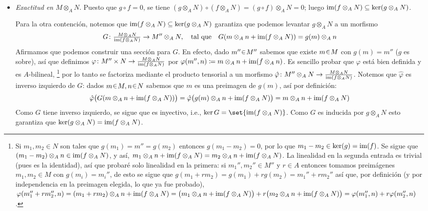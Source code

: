 \begin{sol}
\begin{itemize}
    \item\emph{Exactitud en $M\otimes_A N$}. Puesto que $g\circ f = 0$, se tiene $(g\otimes_A N)\circ(f\otimes_A N) = (g\circ f)\otimes_A N = 0$; luego $\operatorname{im}(f\otimes_A N)\subseteq \ker(g\otimes_A N)$.\par
    Para la otra contención, notemos que $\operatorname{im}(f\otimes_A N)\subseteq \ker(g\otimes_A N)$ garantiza que podemos levantar $g\otimes_A N$ a un morfismo
    \[
    G \colon \tfrac{M \otimes_A N}{\operatorname{im}(f\otimes_AN)} \to M''\otimes_AN,
    \quad\text{tal que}\quad
    G(m\otimes_An+\operatorname{im}(f\otimes_AN)) = g(m)\otimes_An 
    \]
    Afirmamos que podemos construir una sección para $G$. En efecto, dado $m''\en M''$ sabemos que existe $m\en M$ con $g(m)=m''$ ($g$ es sobre), así que definimos $\varphi \colon M''\times N \to \frac{M\otimes_AN}{\operatorname{im}(f\otimes_AN)}$ por $\varphi(m'',n) \coloneq m\otimes_An + \operatorname{im}(f\otimes_An)$. Es sencillo probar que $\varphi$ está bien definida y es $A$-bilineal,%
    \footnote{
        Si $m_1,m_2\in N$ son tales que $g(m_1)=m''=g(m_2)$ entonces $g(m_1-m_2) = 0$, por lo que $m_1-m_2 \in \ker(g) = \operatorname{im}(f)$. Se sigue que $(m_1-m_2)\otimes_A n \in \operatorname{im}(f\otimes_AN)$, y así, $m_1 \otimes_An +\operatorname{im}(f\otimes_AN) = m_2\otimes_An+\operatorname{im}(f\otimes_AN)$. La linealidad en la segunda entrada es trivial (pues es la identidad), así que probaré solo linealidad en la primera: si $m_1'',m_2''\in M''$ y $r\in A$ entonces tomamos preimágenes $m_1,m_2 \in M$ con $g(m_i) = m_i''$, de esto se sigue que $g(m_1 + rm_2) = g(m_1) + rg(m_2) = m_1''+rm_2''$ así que, por definición (y por independencia en la preimagen elegida, lo que ya fue probado), $\varphi(m_1''+rm_2'',n) = (m_1+rm_2)\otimes_An+\operatorname{im}(f\otimes_AN) = \bigl(m_1\otimes_An+\operatorname{im}(f\otimes_AN)\bigr)+r\bigl(m_2\otimes_An+\operatorname{im}(f\otimes_AN)\bigr) = \varphi(m_1'',n)+r\varphi(m_2'',n)$.
    }
    por lo tanto se factoriza mediante el producto tensorial a un morfismo $\hat{\varphi} \colon M''\otimes_AN \to \frac{M\otimes_AN}{\operatorname{im}(f\otimes_AN)}$. Notemos que $\hat{\varphi}$ es inverso izquierdo de $G$: dados $m\en M,n\en N$ sabemos que $m$ es una preimagen de $g(m)$, así por definición:
    \[
    \hat{\varphi}\bigl(G(m\otimes_An+\operatorname{im}(f\otimes_AN))\bigr)
    = \hat{\varphi}\bigl(g(m)\otimes_An+\operatorname{im}(f\otimes_AN)\bigr)
    = m\otimes_An+\operatorname{im}(f\otimes_AN)
    \]
    Como $G$ tiene inverso izquierdo, se sigue que es inyectivo, i.e., $\ker G = \set{\im(f\otimes_AN)}$. Como $G$ es inducida por $g\otimes_AN$ esto garantiza que $\ker(g\otimes_AN) = \operatorname{im}(f\otimes_AN)$. 
\end{itemize}
\end{sol}

